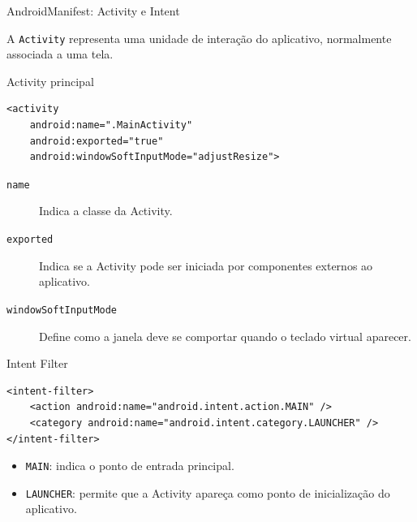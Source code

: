 \documentclass[aspectratio=169]{beamer}
\begin{document}
\begin{frame}[fragile]{AndroidManifest: Activity e Intent}
\small

A \texttt{Activity} representa uma unidade de interação do aplicativo,
normalmente associada a uma tela.

\begin{block}{Activity principal}
\begin{verbatim}
<activity
    android:name=".MainActivity"
    android:exported="true"
    android:windowSoftInputMode="adjustResize">
\end{verbatim}
\end{block}

\begin{description}
    \item[\texttt{name}] Indica a classe da Activity.
    
    \item[\texttt{exported}] Indica se a Activity pode ser iniciada
    por componentes externos ao aplicativo.
    
    \item[\texttt{windowSoftInputMode}] Define como a janela deve
    se comportar quando o teclado virtual aparecer.
\end{description}

\vspace{0.2cm}

\begin{block}{Intent Filter}
    \scriptsize

\begin{verbatim}
<intent-filter>
    <action android:name="android.intent.action.MAIN" />
    <category android:name="android.intent.category.LAUNCHER" />
</intent-filter>
\end{verbatim}

\end{block}

\begin{itemize}
    \item \texttt{MAIN}: indica o ponto de entrada principal.
    \item \texttt{LAUNCHER}: permite que a Activity apareça
    como ponto de inicialização do aplicativo.
\end{itemize}

\end{frame}
\end{document}
